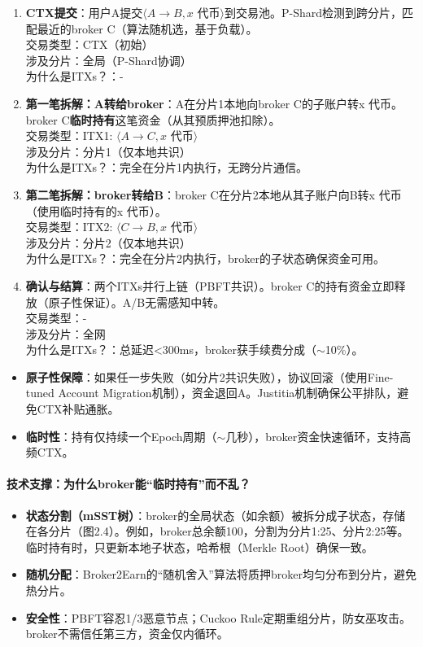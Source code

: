\documentclass[a4paper,12pt]{ctexart}
\begin{document}
\begin{enumerate}
\item \textbf{CTX提交}：用户A提交$\langle A \to B, x$ 代币$\rangle$到交易池。P-Shard检测到跨分片，匹配最近的broker C（算法随机选，基于负载）。\\
交易类型：CTX（初始）\\
涉及分片：全局（P-Shard协调）\\
为什么是ITXs？：-

\item \textbf{第一笔拆解：A转给broker}：A在分片1本地向broker C的子账户转x 代币。broker C\textbf{临时持有}这笔资金（从其预质押池扣除）。\\
交易类型：ITX1: $\langle A \to C, x$ 代币$\rangle$\\
涉及分片：分片1（仅本地共识）\\
为什么是ITXs？：完全在分片1内执行，无跨分片通信。

\item \textbf{第二笔拆解：broker转给B}：broker C在分片2本地从其子账户向B转x 代币（使用临时持有的x 代币）。\\
交易类型：ITX2: $\langle C \to B, x$ 代币$\rangle$\\
涉及分片：分片2（仅本地共识）\\
为什么是ITXs？：完全在分片2内执行，broker的子状态确保资金可用。

\item \textbf{确认与结算}：两个ITXs并行上链（PBFT共识）。broker C的持有资金立即释放（原子性保证）。A/B无需感知中转。\\
交易类型：-\\
涉及分片：全网\\
为什么是ITXs？：总延迟<300ms，broker获手续费分成（$\sim$10\%）。
\end{enumerate}

\begin{itemize}
  \item \textbf{原子性保障}：如果任一步失败（如分片2共识失败），协议回滚（使用Fine-tuned Account Migration机制），资金退回A。Justitia机制确保公平排队，避免CTX补贴通胀。
  \item \textbf{临时性}：持有仅持续一个Epoch周期（$\sim$几秒），broker资金快速循环，支持高频CTX。
\end{itemize}

\paragraph{技术支撑：为什么broker能“临时持有”而不乱？}
\begin{itemize}
  \item \textbf{状态分割（mSST树）}：broker的全局状态（如余额）被拆分成子状态，存储在各分片（图2.4）。例如，broker总余额100，分割为分片1:25、分片2:25等。临时持有时，只更新本地子状态，哈希根（Merkle Root）确保一致。
  \item \textbf{随机分配}：Broker2Earn的“随机舍入”算法将质押broker均匀分布到分片，避免热分片。
  \item \textbf{安全性}：PBFT容忍1/3恶意节点；Cuckoo Rule定期重组分片，防女巫攻击。broker不需信任第三方，资金仅内循环。
\end{itemize}
\end{document}
